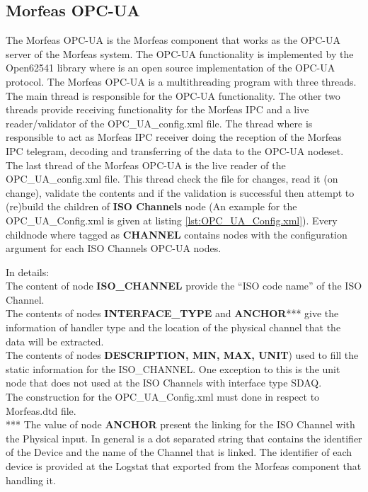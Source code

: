 \subsection{Morfeas OPC-UA}
The Morfeas OPC-UA is the Morfeas component that works as the OPC-UA server of the Morfeas system. The OPC-UA functionality is implemented by the Open62541 library where is an open source
implementation of the OPC-UA protocol. The Morfeas OPC-UA is a multithreading program with three threads. The main thread is responsible for the OPC-UA functionality. The other two threads provide
receiving functionality for the Morfeas IPC and a live reader/validator of the OPC\_UA\_config.xml file.
The thread where is responsible to act as Morfeas IPC receiver doing the reception of the Morfeas IPC telegram, decoding and transferring of the data to the OPC-UA nodeset.
The last thread of the Morfeas OPC-UA is the live reader of the OPC\_UA\_config.xml file. This thread check the file for changes, read it (on change), validate the contents and
if the validation is successful then attempt to (re)build the children of \textbf{ISO Channels} node (An example for the OPC\_UA\_Config.xml is given at listing \ref{lst:OPC_UA_Config.xml}).
Every childnode where tagged as \textbf{CHANNEL} contains nodes with the configuration argument for each ISO Channels OPC-UA nodes.

In details:\\
The content of node \textbf{ISO\_CHANNEL} provide the ``ISO code name'' of the ISO Channel.\\
The contents of nodes \textbf{INTERFACE\_TYPE} and \textbf{ANCHOR}*** give the information of handler type and the location of the physical channel that the data will be extracted.\\
The contents of nodes \textbf{DESCRIPTION, MIN, MAX, UNIT}) used to fill the static information for the ISO\_CHANNEL. One exception to this is the unit node that does not used
at the ISO Channels with interface type SDAQ.\\
The construction for the OPC\_UA\_Config.xml must done in respect to Morfeas.dtd file.\\

*** The value of node \textbf{ANCHOR} present the linking for the ISO Channel with the Physical input. In general is a dot separated string that contains the identifier of
the Device and the name of the Channel that is linked. The identifier of each device is provided at the Logstat that exported from the Morfeas component that handling it.\\

